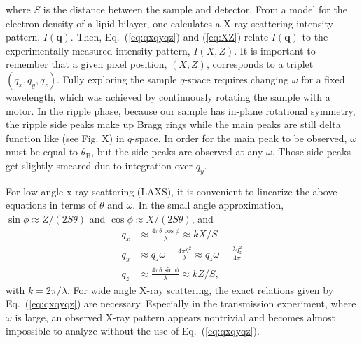 where $S$ is the distance between the sample and detector.
From a model for the electron density of a lipid bilayer, one calculates
a X-ray scattering intensity pattern, $I(\mathbf{q})$. Then, Eq.~(\ref{eq:qxqyqz})
and (\ref{eq:XZ}) relate $I(\mathbf{q})$ to the experimentally measured
intensity pattern, $I(X,Z)$. It is important to remember that a given pixel
position, $(X,Z)$, corresponds to a triplet $(q_x, q_y, q_z)$. Fully exploring 
the sample $q$-space requires changing $\omega$ for a fixed wavelength, which was
achieved by continuously rotating the sample with a motor. In the ripple phase, 
because our sample has in-plane rotational symmetry,
the ripple side peaks make up Bragg rings while the main peaks are still 
delta function like (see Fig. X) in $q$-space. In order for the main peak to be
observed, $\omega$ must be equal to $\theta_\mathrm{B}$, but the side peaks
are observed at any $\omega$. Those side peaks get slightly smeared due to 
integration over $q_y$.

For low angle x-ray scattering (LAXS), it is convenient to linearize the above
equations in terms of $\theta$ and $\omega$. In the small angle approximation, 
$\sin\phi \approx Z/(2S\theta)$ and $\cos\phi \approx X/(2S\theta)$, and
\begin{align}
  q_x &\approx \frac{4\pi\theta\cos\phi}{\lambda} \approx kX/S \nonumber\\
  q_y &\approx q_z\omega -\frac{4\pi\theta^2}{\lambda} \approx q_z\omega - \frac{\lambda q_z^2}{4\pi}\nonumber\\
  q_z &\approx \frac{4\pi\theta\sin\phi}{\lambda} \approx kZ/S,
  \label{eq:qxqyqz_small}
\end{align}
with $k=2\pi/\lambda$. For wide angle X-ray scattering, the exact relations given
by Eq.~(\ref{eq:qxqyqz}) are necessary. Especially in the transmission experiment,
where $\omega$ is large, an observed X-ray pattern appears nontrivial and becomes
almost impossible to analyze without the use of Eq.~(\ref{eq:qxqyqz}).



